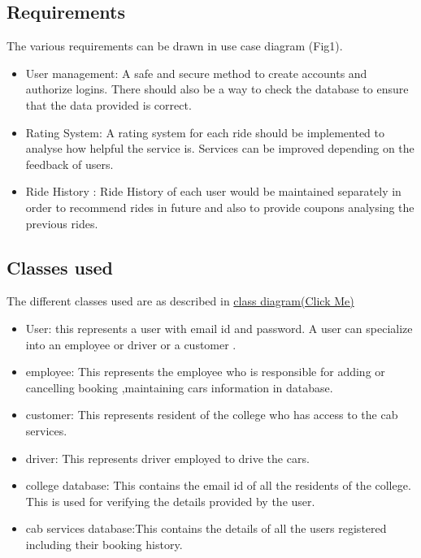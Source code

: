 \documentclass[conference]{IEEEtran}
\begin{document}
\subsection{Requirements}
The various requirements can be drawn in use case diagram (Fig1).
\begin{itemize}
\item User management: A safe and secure method to create accounts and authorize logins. There should also be a way to check the  database to ensure that the data provided is correct.
\item Rating System: A rating system for each ride should be implemented to analyse how helpful the service is. Services can be improved depending on the feedback of users.
\item Ride History : Ride History of each user would be maintained separately in order to recommend rides in future and also to provide coupons analysing the previous rides.

\end{itemize}
\subsection{ Classes used}
The different classes used are as described in 
\href{https://iiitaphyd-my.sharepoint.com/:f:/g/personal/jujjuru_ruchitha_students_iiit_ac_in/Evyw5AfMy19JpH4KClBtnaIBoQvmyfHD7ZdB8GWuyUEfBg?e=yMrs6y}{class diagram(Click Me)}
\begin{itemize}
\item User: this represents a user with email id and password. A user can specialize into an employee or driver or a customer .
\item employee: This represents the  employee who
is responsible for adding or cancelling booking ,maintaining cars information in database.
\item customer: This represents resident  of the
college who has access to the cab services.
\item driver: This represents driver employed to drive the cars.
\item college database: This contains the
email id  of all the residents of the college. This is used for verifying the details provided by
the user.
\item cab services database:This contains the
details  of all the users registered including their booking history.

\end{itemize}
\end{document}
